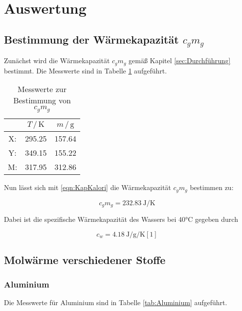 \section{Auswertung}
\label{sec:Auswertung}


\subsection {Bestimmung der Wärmekapazität $c_g m_g$}

Zunächst wird die Wärmekapazität $c_g m_g$ gemäß Kapitel \ref{sec:Durchführung}
bestimmt. Die Messwerte sind in Tabelle \ref{tab:Kalorimeter} aufgeführt.

\begin{table}
\centering
\caption{Messwerte zur Bestimmung von $c_g m_g$}
\label{tab:Kalorimeter}
\begin{tabular}{c c c}
\toprule
$ $ & $T \,/\, \si{\kelvin}$& $m \,/\, \si{\gram}$\\
\midrule
X: & 295.25 & 157.64\\
Y: & 349.15 & 155.22\\
M: & 317.95 & 312.86\\
\bottomrule
\end{tabular}
\end{table}

Nun lässt sich mit \ref{eqn:KapKalori} die Wärmekapazität $c_g m_g$ bestimmen
zu: 

\begin{equation*}
c_g m_g = \SI{232.83}{\joule\per\kelvin}
\end{equation*}

Dabei ist die spezifische Wärmekapazität des Wassers bei 40°C gegeben durch

\begin{equation}
c_w = \SI{4.18}{\joule\per\gram\per\kelvin} [1]
\end{equation}

\subsection{Molwärme verschiedener Stoffe}

\subsubsection{Aluminium}

Die Messwerte für Aluminium sind in Tabelle \ref{tab:Aluminium} aufgeführt.

